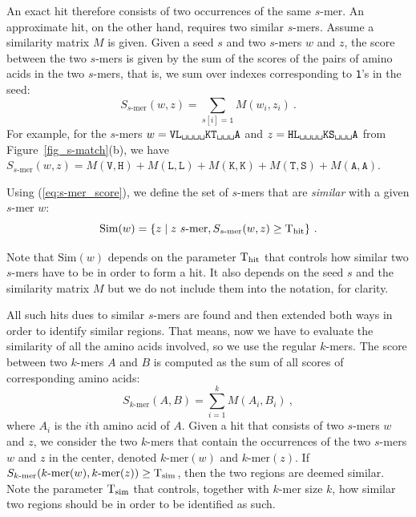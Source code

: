 An exact hit therefore consists of two occurrences of the same $s$-mer. An approximate hit, on the other hand, requires two similar $s$-mers.
Assume a similarity matrix $M$ is given. Given a seed $s$ and two $s$-mers $w$ and $z$, the score between the two $s$-mers is given by the sum of the scores of the pairs of amino acids in the two $s$-mers, that is, we sum over indexes corresponding to \texttt{1}'s in the seed:
\begin{equation}\label{eq:s-mer_score}
S_\textrm{$s$-mer}(w,z) = \sum_{s[i]=\texttt{1}}M(w_i,z_i)\ .
\end{equation}
For example, for the $s$-mers $w = \texttt{VL\textvisiblespace\textvisiblespace\textvisiblespace\textvisiblespace KT\textvisiblespace\textvisiblespace\textvisiblespace A}$ and $z = \texttt{HL\textvisiblespace\textvisiblespace\textvisiblespace\textvisiblespace KS\textvisiblespace\textvisiblespace\textvisiblespace A}$ from Figure~\ref{fig_s-match}(b), we have $S_\textrm{$s$-mer}(w,z) = M(\texttt{V},\texttt{H}) + M(\texttt{L},\texttt{L}) + M(\texttt{K},\texttt{K}) + M(\texttt{T},\texttt{S}) + M(\texttt{A},\texttt{A}).$

Using (\ref{eq:s-mer_score}), we define the set of $s$-mers that are \textit{similar} with a given $s$-mer $w$:
\begin{equation}\label{eq:Sim}
\textrm{Sim}(w) = \{z \mid z \text{ $s$-mer}, S_\textrm{$s$-mer}(w,z) \ge \operatorname{T_{\rm hit}}\}\ .
\end{equation}

Note that $\textrm{Sim}(w)$ depends on the parameter $\operatorname{T_{\rm hit}}$ that controls how similar two $s$-mers have to be in order to form a hit. It also depends on the seed $s$ and the similarity matrix $M$ but we do not include them into the notation, for clarity.

All such hits dues to similar $s$-mers are found and then extended both ways in order to identify similar regions. That means, now we have to evaluate the similarity of all the amino acids involved, so we use the regular $k$-mers.
The score between two $k$-mers $A$ and $B$ is computed as the sum of all scores of corresponding amino acids:
\begin{equation}\label{eq_score_kmer}
S_\textrm{$k$-mer}(A,B) = \sum_{i=1}^kM(A_i,B_i)\ ,
\end{equation}
where $A_i$ is the $i$th amino acid of $A$. Given a hit that consists of two $s$-mers $w$ and $z$, we consider the two $k$-mers that contain the occurrences of the two $s$-mers $w$ and $z$ in the center, denoted $\textrm{$k$-mer}(w)$ and $\textrm{$k$-mer}(z)$. If $S_\textrm{$k$-mer}(\textrm{$k$-mer}(w),\textrm{$k$-mer}(z)) \ge \operatorname{T_{\rm sim}}$, then the two regions are deemed similar. Note the parameter $\operatorname{T_{\rm sim}}$ that controls, together with $k$-mer size $k$, how similar two regions should be in order to be identified as such.

